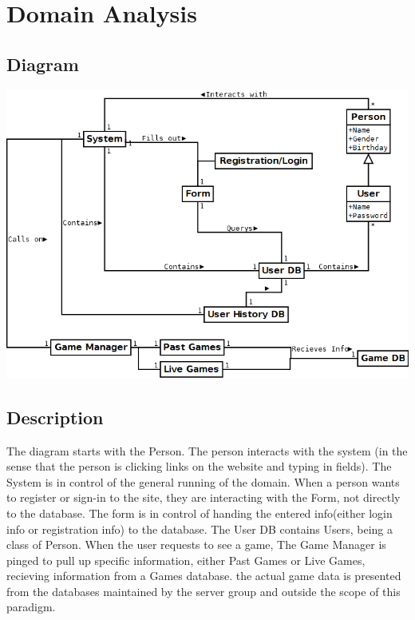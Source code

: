 %

\section{Domain Analysis}

	\subsection{Diagram}
		\includegraphics[width=1.0\textwidth]{./Diagram1.png}

	\subsection{Description}
		The diagram starts with the Person. The person interacts with the system (in the sense that the person is clicking links on the website and typing in fields). The System is in control of the general running of the domain. When a person wants to register or sign-in to the site, they are interacting with the Form, not directly to the database. The form is in control of handing the entered info(either login info or registration info) to the database. The User DB contains Users, being a class of Person. When the user requests to see a game, The Game Manager is pinged to pull up specific information, either Past Games or Live Games, recieving information from a Games database. the actual game data is presented from the databases maintained by the server group and outside the scope of this paradigm. 

\newpage